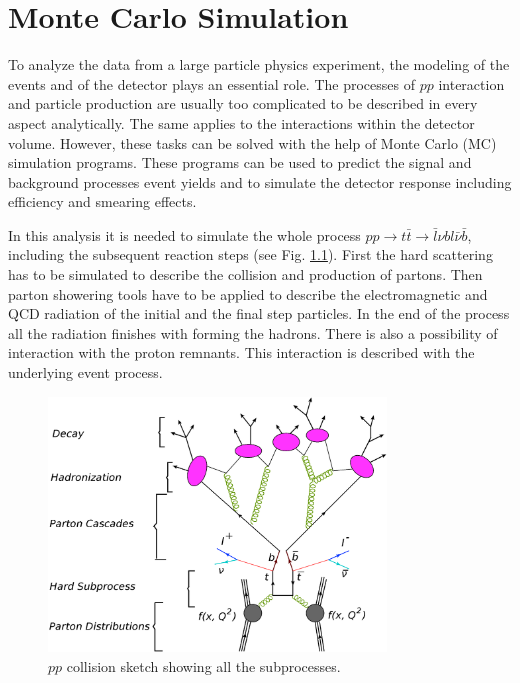\chapter{Monte Carlo Simulation}\label{chapt:MC}

To analyze the data from a large particle physics experiment, the modeling of the events and of the detector
plays an essential role. The processes of $pp$ interaction and particle production are usually too complicated
to be described in every aspect analytically. The same applies to the interactions within the detector volume. However, these 
tasks can be solved with the help of Monte Carlo (MC) simulation programs. These programs can be used to predict
the signal and background processes event yields and to simulate the detector response including efficiency and smearing effects.

In this analysis it is needed to simulate the whole process $pp \rightarrow t\bar{t} \rightarrow \bar{l}\nu bl\bar{\nu}\bar{b}$, 
including the subsequent reaction steps (see Fig. \ref{fig:pp_all}). First the hard scattering has to be
simulated to describe the collision and production of partons. Then parton showering tools have to be applied 
to describe the electromagnetic and QCD radiation of the initial and the final step particles. In the end of the 
process all the radiation finishes with forming the hadrons. There is also a possibility of interaction with the 
proton remnants. This interaction is described with the underlying event process.

\begin{figure}[t]
  \centering
  \includegraphics[width=0.8\textwidth]{03_simulation/plots/pp_all_proc.png}
  \caption{$pp$ collision sketch showing all the subprocesses.}
  \label{fig:pp_all}
\end{figure}

